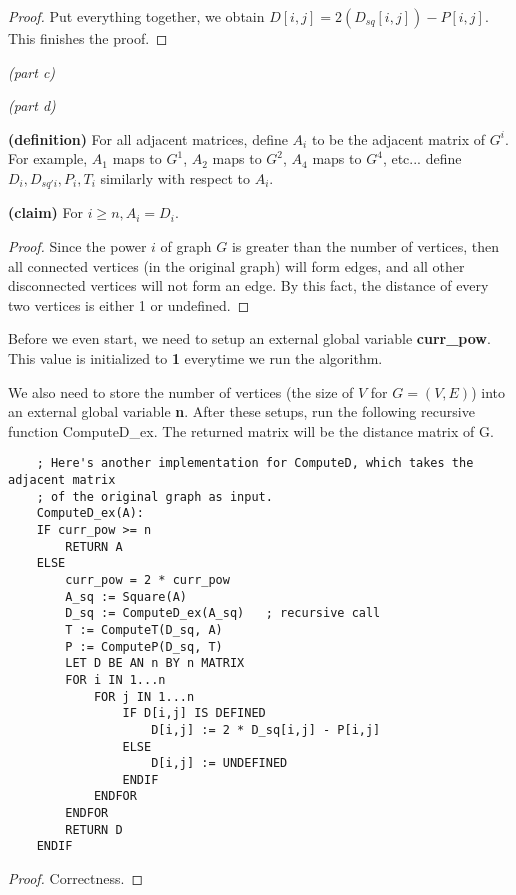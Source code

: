 \documentclass[a4paper, 10pt]{article}
\begin{document}
{\begin{proof}
Put everything together, we obtain $D [i,j] = 2( D_{sq} [i,j] ) - P [i,j]$. This finishes the proof.

\end{proof}

{\noindent\large\it(part c)}

\lipsum[1]

{\noindent\large\it(part d)}

\noindent\textbf{(definition)} For all adjacent matrices, define $A_i$ to be the adjacent matrix of $G^{i}$. For example, $A_1$ maps to $G^1$, $A_2$ maps to $G^2$, $A_4$ maps to $G^{4}$, etc... define $D_i , D_{sq'i}, P_i, T_i$ similarly with respect to $A_i$.

{\noindent\textbf{(claim)} 
For $i \ge n, A_i = D_i$.
}
\begin{proof}
Since the power $i$ of graph $G$ is greater than the number of vertices, then all connected vertices (in the original graph) will form edges, and all other disconnected vertices will not form an edge. By this fact, the distance of every two vertices is either 1 or undefined.
\end{proof}

{\setmainfont{Times New Roman}
Before we even start, we need to setup an external global variable \textbf{curr_pow}. This value is initialized to \textbf{1} everytime we run the algorithm. 

We also need to store the number of vertices (the size of $V$ for $G = (V,E)$) into an external global variable \textbf{n}. After these setups, run the following recursive function ComputeD_ex. The returned matrix will be the distance matrix of G.

\begin{lstlisting}
    ; Here's another implementation for ComputeD, which takes the adjacent matrix 
    ; of the original graph as input.
    ComputeD_ex(A):
    IF curr_pow >= n
        RETURN A
    ELSE
        curr_pow = 2 * curr_pow
        A_sq := Square(A)
        D_sq := ComputeD_ex(A_sq)   ; recursive call
        T := ComputeT(D_sq, A)
        P := ComputeP(D_sq, T)
        LET D BE AN n BY n MATRIX
        FOR i IN 1...n
            FOR j IN 1...n
                IF D[i,j] IS DEFINED
                    D[i,j] := 2 * D_sq[i,j] - P[i,j]
                ELSE
                    D[i,j] := UNDEFINED
                ENDIF
            ENDFOR
        ENDFOR
        RETURN D
    ENDIF
\end{lstlisting}
}
\begin{proof}
Correctness.


\end{proof}}
\end{document}
